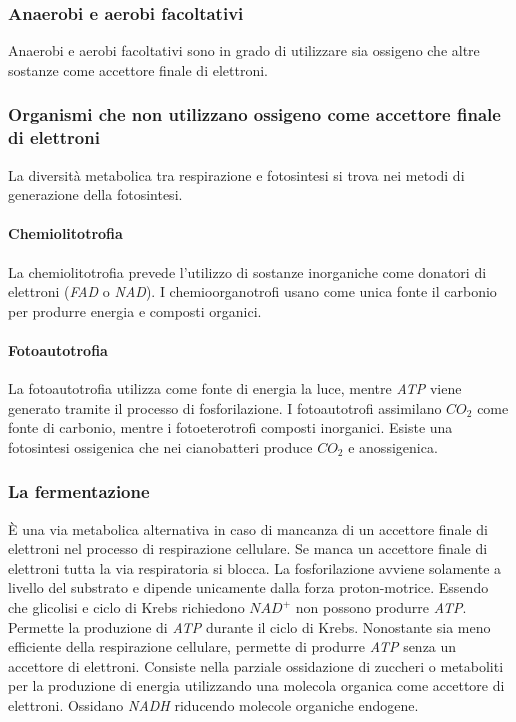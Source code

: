 		\subsubsection{Anaerobi e aerobi facoltativi}
		Anaerobi e aerobi facoltativi sono in grado di utilizzare sia ossigeno che altre sostanze come accettore finale di elettroni.

		\subsubsection{Organismi che non utilizzano ossigeno come accettore finale di elettroni}
		La diversit\`a metabolica tra respirazione e fotosintesi si trova nei metodi di generazione della fotosintesi.
		
			\paragraph{Chemiolitotrofia}
			La chemiolitotrofia prevede l'utilizzo di sostanze inorganiche come donatori di elettroni (\emph{FAD} o \emph{NAD}).
			I chemioorganotrofi usano come unica fonte il carbonio per produrre energia e composti organici.

			\paragraph{Fotoautotrofia}
			La fotoautotrofia utilizza come fonte di energia la luce, mentre \emph{ATP} viene generato tramite il processo di fosforilazione.
			I fotoautotrofi assimilano \emph{$CO_2$} come fonte di carbonio, mentre i fotoeterotrofi composti inorganici.
			Esiste una fotosintesi ossigenica che nei cianobatteri produce \emph{$CO_2$} e anossigenica.

		\subsubsection{La fermentazione}
		\`E una via metabolica alternativa in caso di mancanza di un accettore finale di elettroni nel processo di respirazione cellulare. 
		Se manca un accettore finale di elettroni tutta la via respiratoria si blocca. 
		La fosforilazione avviene solamente a livello del substrato e dipende unicamente dalla forza proton-motrice.
		Essendo che glicolisi e ciclo di Krebs richiedono \emph{$NAD^+$} non possono produrre \emph{ATP}.
		Permette la produzione di \emph{ATP} durante il ciclo di Krebs.
		Nonostante sia meno efficiente della respirazione cellulare, permette di produrre \emph{ATP} senza un accettore di elettroni.
		Consiste nella parziale ossidazione di zuccheri o metaboliti per la produzione di energia utilizzando una molecola organica come accettore di elettroni.
		Ossidano \emph{NADH} riducendo molecole organiche endogene.
			
